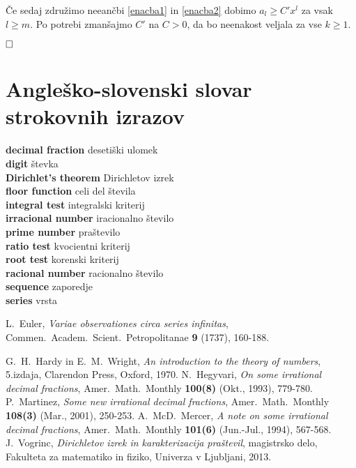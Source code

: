\documentclass[a4paper,12pt]{article}
\newcommand{\geslo}[2]{\noindent\textbf{#1} \quad \hangindent=1cm #2\\[-1pc]}
\def\qed{$\hfill\Box$}   %
\begin{document}
Če sedaj združimo neeančbi \ref{enacba1} in \ref{enacba2} dobimo 
$a_l \geq C'x^l$ za vsak $l \geq m$.
Po potrebi zmanšajmo $C'$ na $C>0$, da bo neenakost veljala
za vse $k \geq 1$.

\qed

\section*{Angleško-slovenski slovar strokovnih izrazov}

\geslo{decimal fraction}{desetiški ulomek}

\geslo{digit}{števka}

\geslo{Dirichlet's theorem}{Dirichletov izrek}

\geslo{floor function}{celi del števila}

\geslo{integral test}{integralski kriterij}

\geslo{irracional number}{iracionalno število}

\geslo{prime number}{praštevilo}

\geslo{ratio test}{kvocientni kriterij}

\geslo{root test}{korenski kriterij}

\geslo{racional number}{racionalno število}

\geslo{sequence}{zaporedje}

\geslo{series}{vrsta}

\begin{thebibliography}{1}
    L.~Euler, \emph{Variae observationes circa series infinitas},
    Commen.~Academ.~Scient.~Petropolitanae \textbf{9} (1737), 160-188.

    G.~H.~Hardy in E.~M.~Wright, \emph{An introduction to the theory of numbers}, 
    5.izdaja, Clarendon Press, Oxford, 1970.
    N.~Hegyvari, \emph{On some irrational decimal fractions},
    Amer.~Math.~Monthly \textbf{100(8)}  (Okt., 1993),  779-780.
    P.~Martinez, \emph{Some new irrational decimal fractions},
    Amer.~Math.~Monthly \textbf{108(3)}  (Mar., 2001),  250-253.
    A.~McD.~Mercer, \emph{A note on some irrational decimal fractions},
    Amer.~Math.~Monthly \textbf{101(6)}  (Jun.-Jul., 1994),  567-568.
    J.~Vogrinc, \emph{Dirichletov izrek in karakterizacija praštevil}, 
    magistrsko delo, Fakulteta za matematiko in fiziko, Univerza v Ljubljani, 2013.
    
\end{thebibliography}
\end{document}
